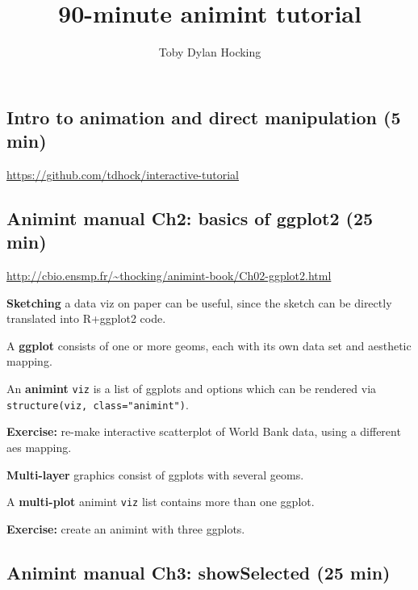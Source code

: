 \documentclass{article}
\begin{document}
\title{90-minute animint tutorial} \author{Toby Dylan Hocking}
\maketitle
\thispagestyle{empty}

\subsection*{Intro to animation and direct manipulation (5 min)}

\url{https://github.com/tdhock/interactive-tutorial}

\subsection*{Animint manual Ch2: basics of ggplot2 (25 min)}

\url{http://cbio.ensmp.fr/~thocking/animint-book/Ch02-ggplot2.html}

\hrulefill

\textbf{Sketching} a data viz on paper can be useful, since the sketch
can be directly translated into R+ggplot2 code.

A \textbf{ggplot} consists of one or more geoms, each with its own
data set and aesthetic mapping.

An \textbf{animint} \texttt{viz} is a list of ggplots and options
which can be rendered via \verb|structure(viz, class="animint")|.

\textbf{Exercise:} re-make interactive scatterplot of World Bank data,
using a different aes mapping.

\hrulefill


\textbf{Multi-layer} graphics consist of ggplots with several geoms.

A \textbf{multi-plot} animint \texttt{viz} list contains more than one
ggplot.

\textbf{Exercise:} create an animint with three ggplots.

\subsection*{Animint manual Ch3: showSelected (25 min)}
\end{document}
